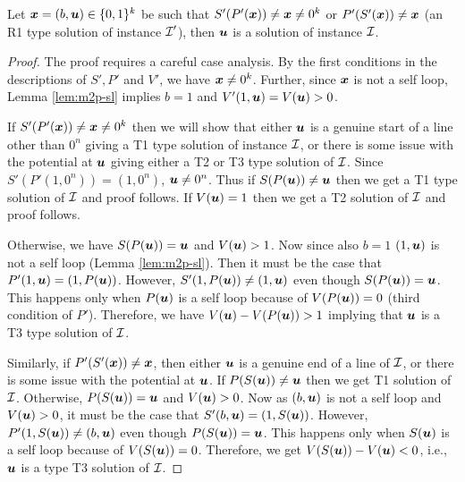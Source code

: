 \begin{lemma}\label{lem:m2p-r1}
Let $\xx=(b,\uu)\in \{0,1\}^k$ be such that $S'(P'(\xx))\neq \xx \neq 0^k$ or $P'(S'(\xx))\neq \xx$ (an R1 type solution of \EOPL instance $\CI'$), then $\uu$ is a solution of \EOML instance $\CI$.
\end{lemma}
\begin{proof}
The proof requires a careful case analysis. 
By the first conditions in the descriptions of $S',P'$ and $V'$, we have $\xx \neq 0^k$. 
Further, since $\xx$ is not a self loop, Lemma \ref{lem:m2p-sl} implies $b=1$  and $V'(1,\uu)=V(\uu)>0$.
\medskip

If $S'(P'(\xx))\neq \xx\neq 0^k$ then we will show that either $\uu$ is a genuine start of a line other than $0^n$ giving a T1 type solution of \EOML instance $\CI$, or there is some issue with the potential at $\uu$ giving either a T2 or T3 type solution of $\CI$. Since $S'(P'(1,0^n))=(1,0^n)$, $\uu \neq 0^n$. Thus if $S(P(\uu))\neq \uu$ then we get a T1 type solution of $\CI$ and proof follows. If $V(\uu)=1$ then we get a T2 solution of $\CI$ and proof follows. 

Otherwise, we have $S(P(\uu))=\uu$ and $V(\uu)>1$. Now since also $b=1$ $(1,\uu)$ is not a self loop (Lemma \ref{lem:m2p-sl}). %
Then it must be the case that $P'(1,\uu)=(1,P(\uu))$. However, $S'(1,P(\uu))\neq (1,\uu)$ even though $S(P(\uu))=\uu$. This happens only when $P(\uu)$ is a self loop because of $V(P(\uu))=0$ (third condition of $P'$).
Therefore, we have $V(\uu)-V(P(\uu))>1$ implying that $\uu$ is a T3 type solution of $\CI$. 
\medskip

Similarly, if $P'(S'(\xx))\neq \xx$, then either $\uu$ is a genuine end of a line of $\CI$, or there is some issue with the potential at $\uu$. If $P(S(\uu))\neq \uu$ then we get T1 solution of $\CI$. Otherwise, $P(S(\uu))=\uu$ and $V(\uu)>0$. Now as $(b,\uu)$ is not a self loop and $V(\uu)>0$, it must be the case that $S'(b,\uu)=(1,S(\uu))$. However, $P'(1, S(\uu))\neq (b,\uu)$ even though $P(S(\uu))=\uu$. This happens only when $S(\uu)$ is a self loop because of $V(S(\uu))=0$. Therefore, we get $V(S(\uu))-V(\uu)<0$, i.e., $\uu$ is a type T3 solution of $\CI$. 
\end{proof}

